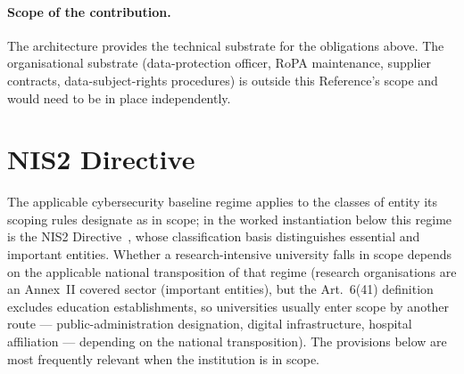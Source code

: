 \paragraph{Scope of the contribution.} The architecture provides
the technical substrate for the obligations above. The
organisational substrate (data-protection officer, RoPA
maintenance, supplier contracts, data-subject-rights procedures)
is outside this Reference's scope and would need to be in place
independently.

\section{NIS2 Directive}
\label{sec:rm-nis2}

The applicable cybersecurity baseline regime applies to the
classes of entity its scoping rules designate as in scope; in the
worked instantiation below this regime is the NIS2
Directive~\cite{nis2}, whose classification basis distinguishes
essential and important entities. Whether a research-intensive
university falls in scope depends on the applicable national
transposition of that regime (research organisations are an
Annex~II covered sector (important entities), but the Art.~6(41)
definition excludes education establishments, so universities
usually enter scope by another route --- public-administration
designation, digital infrastructure, hospital affiliation ---
depending on the national transposition). The provisions below are most
frequently relevant when the institution is in scope.

